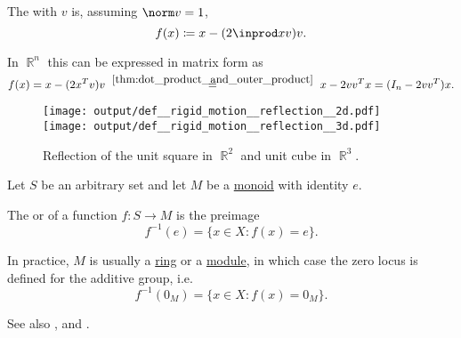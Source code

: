 \begin{definition}
\begin{thmenum}
     The  with  \( v \) is, assuming \( \norm v = 1 \),
    \begin{equation*}
      f(x) \coloneqq x - (2 \inprod x v) v.
    \end{equation*}

    In \( \BbbR^n \) this can be expressed in matrix form as
    \begin{equation*}
      f(x)
      =
      x - (2 x^T v) v
      \reloset {\ref{thm:dot_product_and_outer_product}} =
      x - 2 v v^T x
      =
      (I_n - 2 v v^T) x.
    \end{equation*}

    \begin{figure}[!ht]
      \hfill
      \texttt{[image: output/def\_\_rigid\_motion\_\_reflection\_\_2d.pdf]}
      \hfill
      \texttt{[image: output/def\_\_rigid\_motion\_\_reflection\_\_3d.pdf]}
      \hfill
      \hfill
      \caption{Reflection of the unit square in \( \BbbR^2 \) and unit cube in \( \BbbR^3 \).}\label{fig:def/rigid_motion/reflection}
    \end{figure}
  \end{thmenum}
\end{definition}

\begin{definition}\label{def:zero_locus}
  Let \( S \) be an arbitrary set and let \( M \) be a \hyperref[def:monoid]{monoid} with identity \( e \).

  The  or  of a function \( f: S \to M \) is the preimage
  \begin{equation*}
    f^{-1}(e) = \{ x \in X \colon f(x) = e \}.
  \end{equation*}

  In practice, \( M \) is usually a \hyperref[def:ring]{ring} or a \hyperref[def:module]{module}, in which case the zero locus is defined for the additive group, i.e.
  \begin{equation*}
    f^{-1}(0_M) = \{ x \in X \colon f(x) = 0_M \}.
  \end{equation*}

  See also ,  and .
\end{definition}

